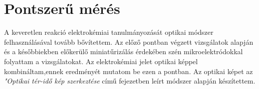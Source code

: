





\section{Pontszerű mérés}
A keveretlen reakció elektrokémiai tanulmányozását optikai módszer felhasználásával tovább bővítettem. Az előző pontban végzett vizsgálatok alapján és a későbbiekben előkerülő miniatűrizálás érdekében szén mikroelektródokkal folyattam a vizsgálatokat. Az elektrokémiai jelet optikai képpel kombináltam,ennek eredményét  mutatom be ezen a pontban. Az optikai képet az \emph{"Optikai tér-idő kép szerkeztése} című fejezetben leírt módszer alapján készítettem.

